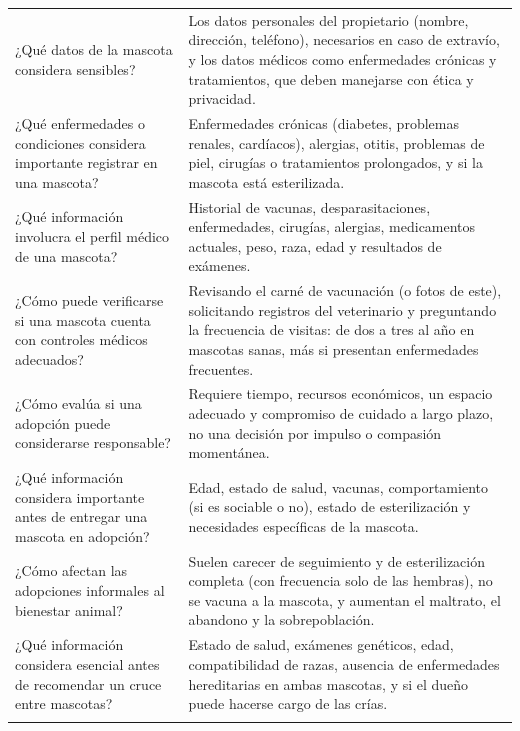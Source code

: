 \documentclass[journal,onecolumn]{IEEEtran}
\begin{document}
{\begin{longtable}{@{}p{5.6cm} p{9.4cm}@{}}
			¿Qué datos de la mascota considera sensibles? & Los datos personales del propietario (nombre, dirección, teléfono), necesarios en caso de extravío, y los datos médicos como enfermedades crónicas y tratamientos, que deben manejarse con ética y privacidad. \\ \addlinespace
			
			¿Qué enfermedades o condiciones considera importante registrar en una mascota? & Enfermedades crónicas (diabetes, problemas renales, cardíacos), alergias, otitis, problemas de piel, cirugías o tratamientos prolongados, y si la mascota está esterilizada. \\ \addlinespace
			
			¿Qué información involucra el perfil médico de una mascota? & Historial de vacunas, desparasitaciones, enfermedades, cirugías, alergias, medicamentos actuales, peso, raza, edad y resultados de exámenes. \\ \addlinespace
			
			¿Cómo puede verificarse si una mascota cuenta con controles médicos adecuados? & Revisando el carné de vacunación (o fotos de este), solicitando registros del veterinario y preguntando la frecuencia de visitas: de dos a tres al año en mascotas sanas, más si presentan enfermedades frecuentes. \\ \addlinespace
			
			¿Cómo evalúa si una adopción puede considerarse responsable? & Requiere tiempo, recursos económicos, un espacio adecuado y compromiso de cuidado a largo plazo, no una decisión por impulso o compasión momentánea. \\ \addlinespace
			
			¿Qué información considera importante antes de entregar una mascota en adopción? & Edad, estado de salud, vacunas, comportamiento (si es sociable o no), estado de esterilización y necesidades específicas de la mascota. \\ \addlinespace
			
			¿Cómo afectan las adopciones informales al bienestar animal? & Suelen carecer de seguimiento y de esterilización completa (con frecuencia solo de las hembras), no se vacuna a la mascota, y aumentan el maltrato, el abandono y la sobrepoblación. \\ \addlinespace
			
			¿Qué información considera esencial antes de recomendar un cruce entre mascotas? & Estado de salud, exámenes genéticos, edad, compatibilidad de razas, ausencia de enfermedades hereditarias en ambas mascotas, y si el dueño puede hacerse cargo de las crías. \\ \addlinespace
			

\end{longtable}}
\end{document}

